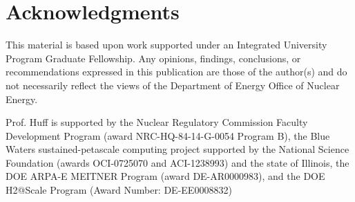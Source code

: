 \section{Acknowledgments}
This material is based upon work supported under an Integrated University 
Program Graduate Fellowship. Any opinions, findings, conclusions, or 
recommendations expressed in this publication are those of the author(s) 
and do not necessarily reflect the views of the Department of Energy Office 
of Nuclear Energy.

Prof. Huff is supported by the Nuclear Regulatory Commission Faculty
Development Program (award NRC-HQ-84-14-G-0054 Program B), the Blue Waters
sustained-petascale computing project supported by the National Science
Foundation (awards OCI-0725070 and ACI-1238993) and the state of Illinois, the
DOE ARPA-E MEITNER Program (award DE-AR0000983), and the DOE H2@Scale Program
(Award Number: DE-EE0008832)
